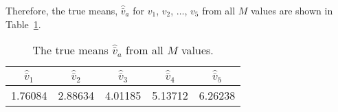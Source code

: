 Therefore, the true means, $\hat{\bar{v}}_a$ for $v_1$, $v_2$, $\ldots$, $v_5$ from
all $M$ values are shown in Table~\ref{tab:truemean}.

\begin{table}[H]
    \centering
    \caption{The true means $\hat{\bar{v}}_a$ from all $M$ values.}
    \label{tab:truemean}
    \begin{tabular}{@{}ccccc@{}}
        \toprule
        $\hat{\bar{v}}_1$ & $\hat{\bar{v}}_2$ & $\hat{\bar{v}}_3$ & $\hat{\bar{v}}_4$ & $\hat{\bar{v}}_5$ \\
        \midrule
        1.76084           & 2.88634           & 4.01185           & 5.13712           & 6.26238           \\
        \bottomrule
    \end{tabular}
\end{table}


